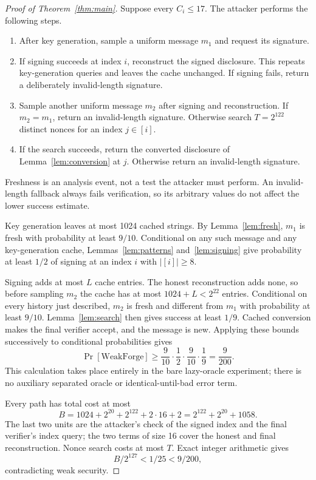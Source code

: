 \documentclass[10pt]{article}
\begin{document}
\begin{proof}[Proof of Theorem~\ref{thm:main}]
Suppose every $C_i\le17$. The attacker performs the following steps.
\begin{enumerate}
\item After key generation, sample a uniform message $m_1$ and request its signature.
\item If signing succeeds at index $i$, reconstruct the signed disclosure. This repeats key-generation queries and leaves the cache unchanged. If signing fails, return a deliberately invalid-length signature.
\item Sample another uniform message $m_2$ after signing and reconstruction. If $m_2=m_1$, return an invalid-length signature. Otherwise search $T=2^{122}$ distinct nonces for an index $j\in[i]$.
\item If the search succeeds, return the converted disclosure of Lemma~\ref{lem:conversion} at $j$. Otherwise return an invalid-length signature.
\end{enumerate}
Freshness is an analysis event, not a test the attacker must perform. An invalid-length fallback always fails verification, so its arbitrary values do not affect the lower success estimate.

Key generation leaves at most 1024 cached strings. By Lemma~\ref{lem:fresh}, $m_1$ is fresh with probability at least $9/10$. Conditional on any such message and any key-generation cache, Lemmas~\ref{lem:patterns} and~\ref{lem:signing} give probability at least $1/2$ of signing at an index $i$ with $|[i]|\ge8$.

Signing adds at most $L$ cache entries. The honest reconstruction adds none, so before sampling $m_2$ the cache has at most $1024+L<2^{22}$ entries. Conditional on every history just described, $m_2$ is fresh and different from $m_1$ with probability at least $9/10$. Lemma~\ref{lem:search} then gives success at least $1/9$. Cached conversion makes the final verifier accept, and the message is new. Applying these bounds successively to conditional probabilities gives
\begin{equation}\label{eq:success}
\Pr[\mathrm{WeakForge}]\ge\frac9{10}\cdot\frac12\cdot\frac9{10}\cdot\frac19
=\frac9{200}.
\end{equation}
This calculation takes place entirely in the bare lazy-oracle experiment; there is no auxiliary separated oracle or identical-until-bad error term.

Every path has total cost at most
\begin{equation}\label{eq:budget}
B=1024+2^{20}+2^{122}+2\cdot16+2
=2^{122}+2^{20}+1058.
\end{equation}
The last two units are the attacker's check of the signed index and the final verifier's index query; the two terms of size 16 cover the honest and final reconstruction. Nonce search costs at most $T$. Exact integer arithmetic gives
\[
B/2^{127}<1/25<9/200,
\]
contradicting weak security.
\end{proof}
\end{document}
